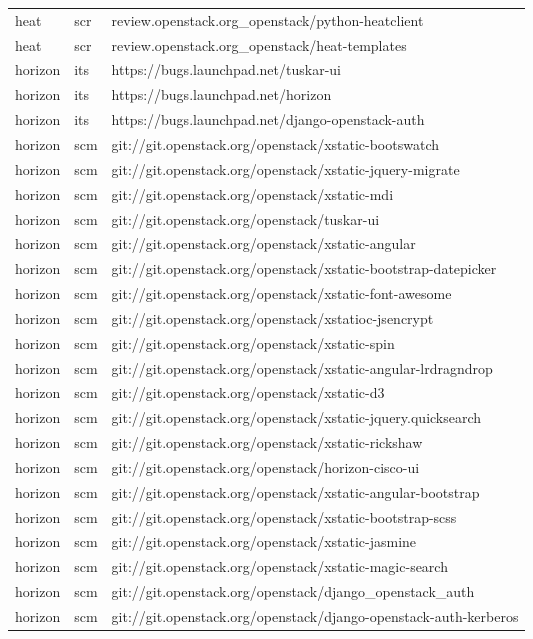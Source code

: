 \begin{center}
\begin{longtable}{|p{4cm}|p{1cm}|p{10cm}|}
heat&scr&review.openstack.org\_openstack/python-heatclient\\ 
heat&scr&review.openstack.org\_openstack/heat-templates\\ 
horizon&its&https://bugs.launchpad.net/tuskar-ui\\ 
horizon&its&https://bugs.launchpad.net/horizon\\ 
horizon&its&https://bugs.launchpad.net/django-openstack-auth\\ 
horizon&scm&git://git.openstack.org/openstack/xstatic-bootswatch\\ 
horizon&scm&git://git.openstack.org/openstack/xstatic-jquery-migrate\\ 
horizon&scm&git://git.openstack.org/openstack/xstatic-mdi\\ 
horizon&scm&git://git.openstack.org/openstack/tuskar-ui\\ 
horizon&scm&git://git.openstack.org/openstack/xstatic-angular\\ 
horizon&scm&git://git.openstack.org/openstack/xstatic-bootstrap-datepicker\\ 
horizon&scm&git://git.openstack.org/openstack/xstatic-font-awesome\\ 
horizon&scm&git://git.openstack.org/openstack/xstatioc-jsencrypt\\ 
horizon&scm&git://git.openstack.org/openstack/xstatic-spin\\ 
horizon&scm&git://git.openstack.org/openstack/xstatic-angular-lrdragndrop\\ 
horizon&scm&git://git.openstack.org/openstack/xstatic-d3\\ 
horizon&scm&git://git.openstack.org/openstack/xstatic-jquery.quicksearch\\ 
horizon&scm&git://git.openstack.org/openstack/xstatic-rickshaw\\ 
horizon&scm&git://git.openstack.org/openstack/horizon-cisco-ui\\ 
horizon&scm&git://git.openstack.org/openstack/xstatic-angular-bootstrap\\ 
horizon&scm&git://git.openstack.org/openstack/xstatic-bootstrap-scss\\ 
horizon&scm&git://git.openstack.org/openstack/xstatic-jasmine\\ 
horizon&scm&git://git.openstack.org/openstack/xstatic-magic-search\\ 
horizon&scm&git://git.openstack.org/openstack/django\_openstack\_auth\\ 
horizon&scm&git://git.openstack.org/openstack/django-openstack-auth-kerberos\\ 

\end{longtable}
\end{center}

